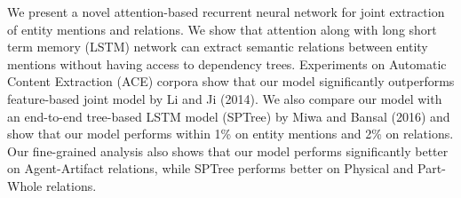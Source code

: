 We present a novel attention-based recurrent neural network for joint extraction of entity mentions and relations. We show that attention along with long short term memory (LSTM) network can extract semantic relations between entity mentions without having access to dependency trees. Experiments on Automatic Content Extraction (ACE) corpora show that our model significantly outperforms feature-based joint model by Li and Ji (2014). We also compare our model with an end-to-end tree-based LSTM model (SPTree) by Miwa and Bansal (2016) and show that our model performs within 1\% on entity mentions and 2\% on relations. Our fine-grained analysis also shows that our model performs significantly better on Agent-Artifact relations, while SPTree performs better on Physical and Part-Whole relations.
